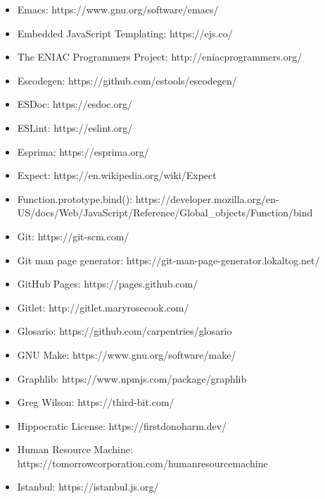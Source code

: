 \documentclass[krantzl]{krantz}
\begin{document}
\begin{itemize}
\item Emacs: https://www.gnu.org/software/emacs/

\item Embedded JavaScript Templating: https://ejs.co/

\item The ENIAC Programmers Project: http://eniacprogrammers.org/

\item Escodegen: https://github.com/estools/escodegen/

\item ESDoc: https://esdoc.org/

\item ESLint: https://eslint.org/

\item Esprima: https://esprima.org/

\item Expect: https://en.wikipedia.org/wiki/Expect

\item Function.prototype.bind(): https://developer.mozilla.org/en-US/docs/Web/JavaScript/Reference/Global\_objects/Function/bind

\item Git: https://git-scm.com/

\item Git man page generator: https://git-man-page-generator.lokaltog.net/

\item GitHub Pages: https://pages.github.com/

\item Gitlet: http://gitlet.maryrosecook.com/

\item Glosario: https://github.com/carpentries/glosario

\item GNU Make: https://www.gnu.org/software/make/

\item Graphlib: https://www.npmjs.com/package/graphlib

\item Greg Wilson: https://third-bit.com/

\item Hippocratic License: https://firstdonoharm.dev/

\item Human Resource Machine: https://tomorrowcorporation.com/humanresourcemachine

\item Istanbul: https://istanbul.js.org/


\end{itemize}
\end{document}
